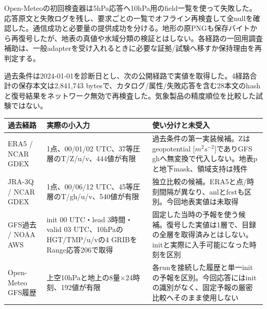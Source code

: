 \documentclass[11pt,a4paper]{article}
\newcounter{none}
\begin{document}
Open-Meteoの初回検査器は5hPa応答へ10hPa用のfield一覧を使って失敗した。応答原文と失敗ログを残し、要求ごとの一覧でオフライン再検査して全nullを確認した。通信成功と必要量の提供成功を分ける。地形の原PNGも保存バイトから再復号したが、地表の真値や水域分類の検証とはしない。各経路の一回用調査補助は、一般adapterを受け入れるときに必要な証拠/試験へ移すか保持理由を再判定する。

過去条件は2024-01-01を診断日とし、次の公開経路で実値を取得した。4経路合計の保存本文は2,841,743
bytesで、カタログ/属性/失敗応答を含む28本文のhashと復号結果をネットワーク無効で再検査した。気象製品の精度順位を比較した試験ではない。

{\def\LTcaptype{none} %
\begin{longtable}[]{@{}
  >{\raggedright\arraybackslash}p{}
  >{\raggedright\arraybackslash}p{}
  >{\raggedright\arraybackslash}p{}@{}}
\toprule\noalign{}
\begin{minipage}[b]{\linewidth}\raggedright
過去経路
\end{minipage} & \begin{minipage}[b]{\linewidth}\raggedright
実際の小入力
\end{minipage} & \begin{minipage}[b]{\linewidth}\raggedright
使い分けと未受入
\end{minipage} \\
\midrule\noalign{}
\endhead
\bottomrule\noalign{}
\endlastfoot
ERA5 / NCAR GDEX & 1点、00/01/02 UTC、37等圧層のT/Z/u/v、444値が有限 &
過去条件の第一実装候補。Zはgeopotential {[}\(m^2s^{-2}\){]}でありGFS
ghへ無変換で代入しない。地表pと地下mask、領域支持は残件 \\
JRA-3Q / NCAR GDEX & 1点、00/06/12 UTC、45等圧層のT/gh/u/v、540値が有限
&
独立比較の候補。ERA5と点/時刻間隔が異なり、anlとfcstも区別。今回地表実値は未取得 \\
GFS過去 / NOAA AWS & init 00 UTC・lead 3時間・valid 03
UTC、10hPaのHGT/TMP/u/vの4 GRIBをRange応答206で取得 &
固定した当時の予報を使う候補。復号した実値は1層で、目録の全層を取得済みとはしない。initと実際に入手可能になった時刻を区別 \\
Open-Meteo GFS履歴 & 上空10hPaと地上の8量×24時刻、192値が有限 &
各runを接続した履歴と単一initの予報を区別。今回応答にはinitの識別がなく、固定予報の厳密比較へそのまま使用しない \\
\end{longtable}
}
\end{document}
